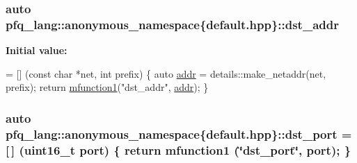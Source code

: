 \hypertarget{namespacepfq__lang_1_1anonymous__namespace_02default_8hpp_03_a4b72bac7c3af312ffe7c670eb2583f9a}{
\subsubsection[{dst\+\_\+addr}]{\setlength{\rightskip}{0pt plus 5cm}auto pfq\+\_\+lang\+::anonymous\+\_\+namespace\{default.\+hpp\}\+::dst\+\_\+addr}}\label{namespacepfq__lang_1_1anonymous__namespace_02default_8hpp_03_a4b72bac7c3af312ffe7c670eb2583f9a}
{\bfseries Initial value\+:}
\begin{DoxyCode}
= [] (\textcolor{keyword}{const} \textcolor{keywordtype}{char} *net, \textcolor{keywordtype}{int} prefix)
        \{
            \textcolor{keyword}{auto} \hyperlink{namespacepfq__lang_1_1anonymous__namespace_02default_8hpp_03_aafce8334d1be83bff9a2115439c8c453}{addr} = details::make\_netaddr(net, prefix);
            \textcolor{keywordflow}{return} \hyperlink{namespacepfq__lang_a3cc9d61411c0398bb46aa2b33a21f7ed}{mfunction1}(\textcolor{stringliteral}{"dst\_addr"}, \hyperlink{namespacepfq__lang_1_1anonymous__namespace_02default_8hpp_03_aafce8334d1be83bff9a2115439c8c453}{addr});
        \}
\end{DoxyCode}
\hypertarget{namespacepfq__lang_1_1anonymous__namespace_02default_8hpp_03_aceccbe6ec912638fb8d5d3d9e0372a09}{
\subsubsection[{dst\+\_\+port}]{\setlength{\rightskip}{0pt plus 5cm}auto pfq\+\_\+lang\+::anonymous\+\_\+namespace\{default.\+hpp\}\+::dst\+\_\+port = \mbox{[}$\,$\mbox{]} (uint16\+\_\+t {\bf port}) \{ return {\bf mfunction1} (\char`\"{}dst\+\_\+port\char`\"{}, port); \}}}\label{namespacepfq__lang_1_1anonymous__namespace_02default_8hpp_03_aceccbe6ec912638fb8d5d3d9e0372a09}

